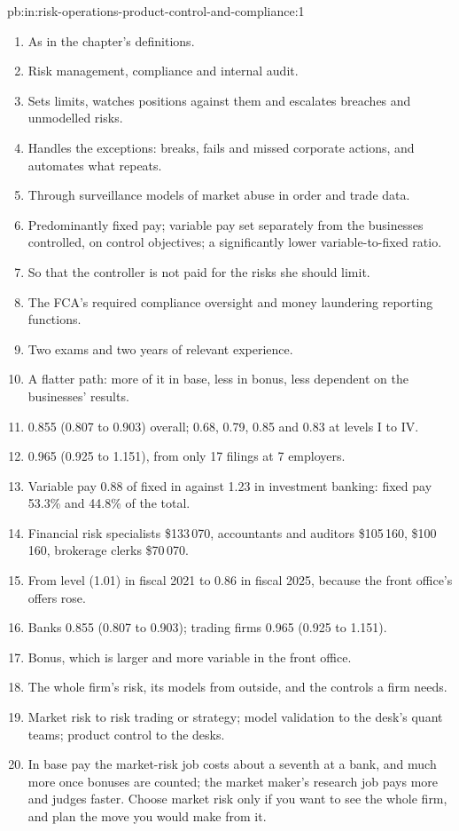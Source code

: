 \begin{solution}{pb:in:risk-operations-product-control-and-compliance:1}
\begin{enumerate}
\item As in the chapter's definitions.
\item Risk management, compliance and internal audit.
\item Sets limits, watches positions against them and escalates breaches and unmodelled risks.
\item Handles the exceptions: breaks, fails and missed corporate actions, and automates what repeats.
\item Through surveillance models of market abuse in order and trade data.
\item Predominantly fixed pay; variable pay set separately from the businesses controlled, on control objectives; a
significantly lower variable-to-fixed ratio.
\item So that the controller is not paid for the risks she should limit.
\item The FCA's required compliance oversight and money laundering reporting functions.
\item Two exams and two years of relevant experience.
\item A flatter path: more of it in base, less in bonus, less dependent on the businesses' results.
\item 0.855 (0.807 to 0.903) overall; 0.68, 0.79, 0.85 and 0.83 at levels I to IV.
\item 0.965 (0.925 to 1.151), from only 17 filings at 7 employers.
\item Variable pay 0.88 of fixed in  against 1.23 in investment banking: fixed pay 53.3\% and 44.8\% of
the total.
\item Financial risk specialists \$133\,070, accountants and auditors \$105\,160,  \$100\,160,
brokerage clerks \$70\,070.
\item From level (1.01) in fiscal 2021 to 0.86 in fiscal 2025, because the front office's offers rose.
\item Banks 0.855 (0.807 to 0.903); trading firms 0.965 (0.925 to 1.151).
\item Bonus, which is larger and more variable in the front office.
\item The whole firm's risk, its models from outside, and the controls a firm needs.
\item Market risk to risk trading or strategy; model validation to the desk's quant teams; product control to the desks.
\item In base pay the market-risk job costs about a seventh at a bank, and much more once bonuses are counted; the
market maker's research job pays more and judges faster. Choose market risk only if you want to see the whole firm, and
plan the move you would make from it.
\end{enumerate}
\end{solution}


